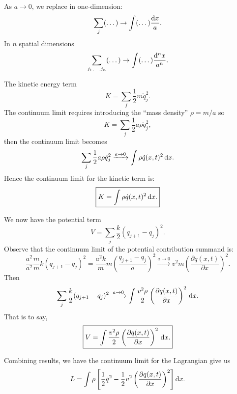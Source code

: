 As $a\to0$, we replace in one-dimension:
\begin{equation}
\sum_{j}(\dots)\to\int(\dots)\frac{\mathrm{d} x}{a}.
\end{equation}
In $n$ spatial dimensions
\begin{equation}
\sum_{j_{1},\dots,j_{n}}(\dots)\to\int(\dots)\frac{\mathrm{d}^{n} x}{a^{n}}.
\end{equation}


The kinetic energy term
\begin{equation}
K = \sum_{j}\frac{1}{2}m\dot{q}^{2}_{j}.
\end{equation}
The continuum limit requires introducing the ``mass density'' $\rho=m/a$
so
\begin{equation}
K = \sum_{j}\frac{1}{2}a\rho\dot{q}^{2}_{j},
\end{equation}
then the continuum limit becomes
\begin{equation}
\sum_{j}\frac{1}{2}a\rho\dot{q}^{2}_{j}\xrightarrow{a\to0}\int\rho\dot{q}(x,t)^{2}\,\mathrm{d} x.
\end{equation}
Hence the continuum limit for the kinetic term is:
\begin{equation}
\boxed{K = \int\rho\dot{q}(x,t)^{2}\,\mathrm{d} x.}
\end{equation}

We now have the potential term
\begin{equation}
V = \sum_{j}\frac{k}{2}(q_{j+1}-q_{j})^{2}.
\end{equation}
Observe that the continuum limit of the potential contribution summand is:
\begin{equation}
\frac{a^{2}}{a^{2}}\frac{m}{m}k(q_{j+1}-q_{j})^{2}
=\frac{a^{2}k}{m}m\left(\frac{q_{j+1}-q_{j}}{a}\right)^{2}
\xrightarrow{a\to0}
v^{2}m\left(\frac{\partial q(x,t)}{\partial x}\right)^{2}.
\end{equation}
Then
\begin{equation}
\sum_{j}\frac{k}{2}(q_{j+1}-q_{j})^{2}\xrightarrow{a\to0}\int \frac{v^{2}\rho}{2}
\left(\frac{\partial q(x,t)}{\partial x}\right)^{2}\,\mathrm{d} x.
\end{equation}
That is to say,
\begin{equation}
\boxed{V = \int \frac{v^{2}\rho}{2}\left(\frac{\partial q(x,t)}{\partial x}\right)^{2}\,\mathrm{d} x.}
\end{equation}

\M
Combining results, we have the continuum limit for the Lagrangian give
us
\begin{equation}
L = \int\rho\left[\frac{1}{2}\dot{q}^{2}-\frac{1}{2}v^{2}\left(\frac{\partial q(x,t)}{\partial x}\right)^{2}\right]\mathrm{d} x.
\end{equation}

